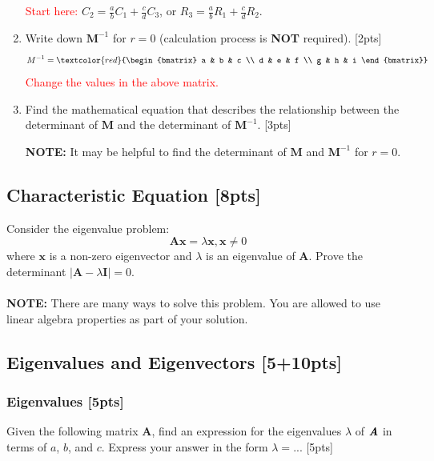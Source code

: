 \documentclass{article}
\begin{document}
\begin{enumerate}[label=(\alph*)]
    \textcolor{red}{Start here: } $C_2 = \frac{a}{b}C_1 + \frac{c}{d}C_3$, or $R_3 = \frac{a}{b}R_1 + \frac{c}{d}R_2$.
    \item Write down $\boldsymbol{M}^{-1}$ for $r = 0$ (calculation process is \textbf{NOT} required). [2pts]
    $$ M^{-1} = 
    \textcolor{red}{\begin{bmatrix} 
        a & b & c \\ 
        d & e & f \\
        g & h & i
    \end{bmatrix}}$$
    \textcolor{red}{Change the values in the above matrix.}
    \item Find the mathematical equation that describes the relationship between the determinant of $\boldsymbol{M}$ and the determinant of $\boldsymbol{M}^{-1}$. [3pts]
    \par\textbf{NOTE:} It may be helpful to find the determinant of $\boldsymbol{M}$ and $\boldsymbol{M}^{-1}$ for $r = 0$.
    
\end{enumerate}
\newpage



\subsection{Characteristic Equation [8pts]}
Consider the eigenvalue problem: 
$$\boldsymbol{Ax} =\lambda \boldsymbol{x}, \boldsymbol{x} \neq 0$$
where $\boldsymbol{x}$ is a non-zero eigenvector and $\lambda$ is an eigenvalue of $\boldsymbol{A}$. Prove the determinant $|\boldsymbol{A}-\lambda \boldsymbol{I}|= 0$.\\ \\
\textbf{NOTE:} There are many ways to solve this problem. You are allowed to use linear algebra properties as part of your solution. \\
\newpage



\subsection{Eigenvalues and Eigenvectors [5+10pts]}
\subsubsection{Eigenvalues [5pts]}
Given the following matrix $\boldsymbol{A}$, find an expression for the eigenvalues $\lambda$ of $\textbf{\textit{A}}$ in terms of $a$, $b$, and $c$. Express your answer in the form $\lambda =$... [5pts] 
\end{document}

